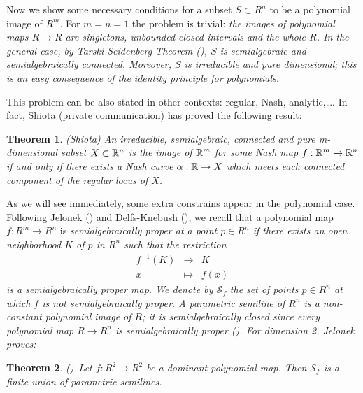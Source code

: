 \documentclass[11pt,draft]{article}
\newtheorem{thm}{Theorem}[section]
\begin{document}
Now we show some necessary conditions for a subset $S\subset R^n$ to be a polynomial
image of $R^m$. For $m=n=1$ the problem is trivial: \em the images of polynomial maps $R\rightarrow R$ are
singletons, unbounded closed intervals and the whole $R$\em. In the general case, by Tarski-Seidenberg Theorem
(\cite{bcr}),
$S$ is semialgebraic and semialgebraically connected. Moreover, $S$ is irreducible and pure dimensional; this
is an easy consequence of the identity principle for polynomials.

This problem can be also stated in other contexts: regular, Nash, analytic,\ldots. In fact,
Shiota (private communication) has proved the following result:
\begin{thm}\em (Shiota) \em\label{sh}
An irreducible, semialgebraic, connected and pure m-dimensional subset $X\subset{\mathbb R}^n$ is the
image of ${\mathbb R}^m$ for some Nash map $f:{\mathbb R}^m\rightarrow{\mathbb R}^n$ if and only if there
exists a Nash curve $\alpha:{\mathbb R}\rightarrow X$ which meets each connected component of the
regular locus of $X$.
\end{thm}

As we will see immediately, some extra constrains appear in the polynomial case.
Following Jelonek (\cite{j}) and Delfs-Knebush (\cite[\S 9]{dk}), we recall that a 
polynomial map
$f:R^m\rightarrow R^n$ is
\em semialgebraically proper at a point
$p\in R^n$ \em if there exists an open neighborhood $K$ of $p$ in $R^n$ such that the
restriction 
\begin{equation*}
\begin{array}{rcl}
f^{-1}(K)&\rightarrow& K\\
 x\ \ \ &\mapsto& f(x)
\end{array}
\end{equation*}
is a semialgebraically proper map. We denote by ${\mathcal S}_f$ the set of points $p\in
R^n$ at which $f$ is not semialgebraically proper. A \em parametric
semiline of $R^n$
\em is a non-constant polynomial image of $R$; it is semialgebraically closed since every
polynomial map $R \rightarrow R^n$ is semialgebraically proper (\cite{gu}). For dimension
2, Jelonek proves:
\begin{thm}\label{j}
\em (\cite{j})\  \em Let $f:R^2\rightarrow R^2$ be a dominant polynomial map. Then
${\mathcal S}_f$ is a finite union of parametric semilines.
\end{thm}
\end{document}

